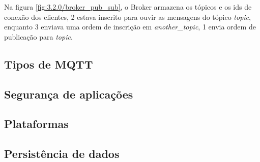 Na figura \ref{fig:3.2.0/broker_pub_sub}, o Broker armazena os tópicos e os ids de conexão dos clientes, 2 estava inscrito para ouvir as mensagens do tópico \textit{topic}, enquanto 3 enviava uma ordem de inscrição em \textit{another\_topic}, 1 envia ordem de publicação para \textit{topic}.


\subsection{Tipos de MQTT}
\label{subsection:tipos_mqtt}


\subsection{Segurança de aplicações}
\label{subsection:seguranca}



\subsection{Plataformas}
\label{subsection:plataformas}


\subsection{Persistência de dados}
\label{subsection:persistencia}

